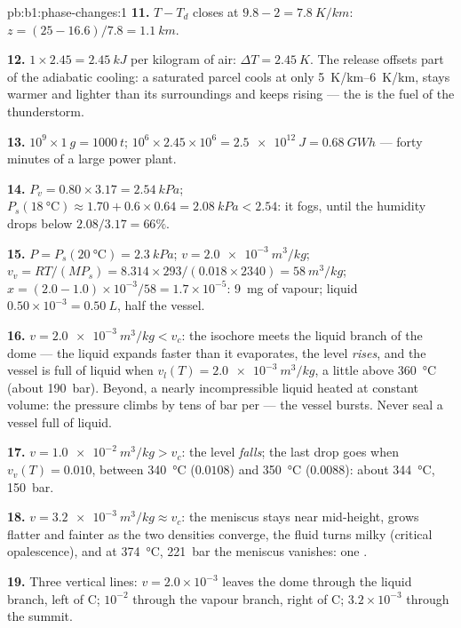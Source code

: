 \begin{solution}{pb:b1:phase-changes:1}
\textbf{11.} $T - T_d$ closes at $9.8 - 2 = \qty{7.8}{K/km}$: $z = (25 - 16.6)/
7.8 = \qty{1.1}{km}$.

\textbf{12.} $1 \times 2.45 = \qty{2.45}{kJ}$ per kilogram of air: $\Delta T =
\qty{2.45}{K}$. The release offsets part of the adiabatic cooling: a
saturated parcel cools at only \qtyrange{5}{6}{K/km}, stays warmer and
lighter than its surroundings and keeps rising --- the  is
the fuel of the thunderstorm.

\textbf{13.} $10^9 \times \qty{1}{g} = \qty{1000}{t}$; $10^6 \times 2.45 \times 10^6 =
\qty{2.5e12}{J} = \qty{0.68}{GW h}$ --- forty minutes of a large power plant.

\textbf{14.} $P_v = 0.80 \times 3.17 = \qty{2.54}{kPa}$; $P_s(\qty{18}{\degreeCelsius})
\approx 1.70 + 0.6 \times 0.64 = \qty{2.08}{kPa} < 2.54$: it fogs, until the
humidity drops below $2.08/3.17 = 66\%$.

\textbf{15.} $P = P_s(\qty{20}{\degreeCelsius}) = \qty{2.3}{kPa}$; $v = \qty{2.0e-3}{m^3/kg}$;
$v_v = RT/(MP_s) = 8.314 \times 293/(0.018 \times 2340) = \qty{58}{m^3/kg}$; $x =
(2.0 - 1.0) \times 10^{-3}/58 = 1.7 \times 10^{-5}$: \qty{9}{mg} of vapour;
liquid $0.50 \times 10^{-3} = \qty{0.50}{L}$, half the vessel.

\textbf{16.} $v = \qty{2.0e-3}{m^3/kg} < v_c$: the isochore meets the liquid
branch of the dome --- the liquid expands faster than it evaporates, the
level \emph{rises}, and the vessel is full of liquid when $v_l(T) =
\qty{2.0e-3}{m^3/kg}$, a little above \qty{360}{\degreeCelsius} (about
\qty{190}{bar}). Beyond, a nearly incompressible liquid heated at constant
volume: the pressure climbs by tens of bar per  --- the vessel
bursts. Never seal a vessel full of liquid.

\textbf{17.} $v = \qty{1.0e-2}{m^3/kg} > v_c$: the level \emph{falls}; the last
drop goes when $v_v(T) = 0.010$, between \qty{340}{\degreeCelsius} ($0.0108$)
and \qty{350}{\degreeCelsius} ($0.0088$): about \qty{344}{\degreeCelsius},
\qty{150}{bar}.

\textbf{18.} $v = \qty{3.2e-3}{m^3/kg} \approx v_c$: the meniscus stays near
mid-height, grows flatter and fainter as the two densities converge,
the fluid turns milky (critical opalescence), and at \qty{374}{\degreeCelsius},
\qty{221}{bar} the meniscus vanishes: one .

\textbf{19.} Three vertical lines: $v = 2.0 \times 10^{-3}$ leaves the dome
through the liquid branch, left of C; $10^{-2}$ through the vapour branch,
right of C; $3.2 \times 10^{-3}$ through the summit.


\end{solution}
